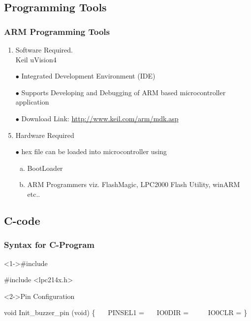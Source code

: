 \documentclass[10pt,red]{beamer}
\begin{document}
\subsection{Programming Tools}

\begin{frame}
	\frametitle{ARM Programming Tools}	\pause
		\begin{enumerate}
			\item <+-|alert@+> Software Required.\pause\\[10pt]
				Keil uVision4 \pause\\[10pt]
				\item[$\bullet$]Integrated Development Environment (IDE) \\
				\item[$\bullet$]Supports Developing and Debugging of ARM based microcontroller application\\ 
				
			\item [$\bullet$] Download Link: \url{http://www.keil.com/arm/mdk.asp}  \pause\\[10pt]
 			\item <+-|alert@+> Hardware Required\pause\\[10pt]
			 
			\item[$\bullet$] hex file can be loaded into microcontroller using \pause\\
			\begin{enumerate}[a.]
				\item<+-|alert@+>	BootLoader\pause
				\item<+-|alert@+>	ARM Programmers viz. FlashMagic, LPC2000 Flash Utility, winARM etc..	
			\end{enumerate}
		\end{enumerate}
\end{frame}
\subsection{C-code}

\begin{frame}[shrink = 2,fragile] 
	\frametitle{Syntax for C-Program}\pause
	
		\begin{block}<1->{\#include}\pause
		\begin{semiverbatim}
				#include <lpc214x.h>
 		\end{semiverbatim}
		\end{block} \pause
		
	\begin{block}<2->{Pin Configuration}\pause
		\begin{semiverbatim}
				void Init_buzzer_pin (void)
				\{
 			 \ \ \		PINSEL1 = 		
 			 \ \ \		IO0DIR =
			 \ \ \ \ \		IO0CLR =  	\color{red}{\\\\ Initially buzzer off}\color{black}
				\}
 		\end{semiverbatim}
		\end{block}	
\end{frame}
\end{document}
